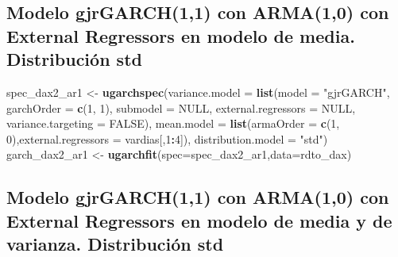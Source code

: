\documentclass[
  11pt,
]{article}
\newenvironment{Shaded}{\begin{snugshade}}{\end{snugshade}}
\newcommand{\DataTypeTok}[1]{\textcolor[rgb]{0.13,0.29,0.53}{#1}}
\newcommand{\DecValTok}[1]{\textcolor[rgb]{0.00,0.00,0.81}{#1}}
\newcommand{\KeywordTok}[1]{\textcolor[rgb]{0.13,0.29,0.53}{\textbf{#1}}}
\newcommand{\NormalTok}[1]{#1}
\newcommand{\OperatorTok}[1]{\textcolor[rgb]{0.81,0.36,0.00}{\textbf{#1}}}
\newcommand{\OtherTok}[1]{\textcolor[rgb]{0.56,0.35,0.01}{#1}}
\newcommand{\StringTok}[1]{\textcolor[rgb]{0.31,0.60,0.02}{#1}}
\begin{document}
\hypertarget{modelo-gjrgarch11-con-arma10-con-external-regressors-en-modelo-de-media.-distribuciuxf3n-std}{%
\subsection{Modelo gjrGARCH(1,1) con ARMA(1,0) con External Regressors
en modelo de media. Distribución
std}\label{modelo-gjrgarch11-con-arma10-con-external-regressors-en-modelo-de-media.-distribuciuxf3n-std}}

\begin{Shaded}
\begin{Highlighting}[]
\NormalTok{spec_dax2_ar1 <-}\StringTok{ }\KeywordTok{ugarchspec}\NormalTok{(}\DataTypeTok{variance.model =} \KeywordTok{list}\NormalTok{(}\DataTypeTok{model =} \StringTok{"gjrGARCH"}\NormalTok{, }\DataTypeTok{garchOrder =} \KeywordTok{c}\NormalTok{(}\DecValTok{1}\NormalTok{, }\DecValTok{1}\NormalTok{), }
                    \DataTypeTok{submodel =} \OtherTok{NULL}\NormalTok{, }\DataTypeTok{external.regressors =} \OtherTok{NULL}\NormalTok{, }\DataTypeTok{variance.targeting =} \OtherTok{FALSE}\NormalTok{), }
                    \DataTypeTok{mean.model =} \KeywordTok{list}\NormalTok{(}\DataTypeTok{armaOrder =} \KeywordTok{c}\NormalTok{(}\DecValTok{1}\NormalTok{, }\DecValTok{0}\NormalTok{),}\DataTypeTok{external.regressors =}\NormalTok{ vardias[,}\DecValTok{1}\OperatorTok{:}\DecValTok{4}\NormalTok{]),}
               \DataTypeTok{distribution.model =} \StringTok{"std"}\NormalTok{)}
\NormalTok{garch_dax2_ar1 <-}\StringTok{ }\KeywordTok{ugarchfit}\NormalTok{(}\DataTypeTok{spec=}\NormalTok{spec_dax2_ar1,}\DataTypeTok{data=}\NormalTok{rdto_dax)}
\end{Highlighting}
\end{Shaded}

\hypertarget{modelo-gjrgarch11-con-arma10-con-external-regressors-en-modelo-de-media-y-de-varianza.-distribuciuxf3n-std}{%
\subsection{Modelo gjrGARCH(1,1) con ARMA(1,0) con External Regressors
en modelo de media y de varianza. Distribución
std}\label{modelo-gjrgarch11-con-arma10-con-external-regressors-en-modelo-de-media-y-de-varianza.-distribuciuxf3n-std}}
\end{document}
